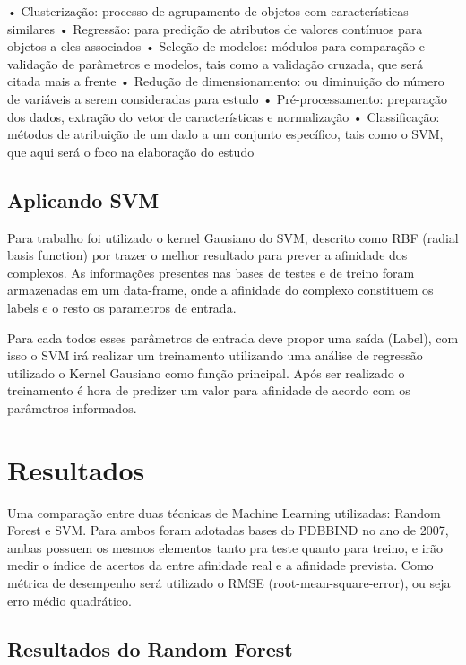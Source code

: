 \documentclass[tcc, capa]{texucpel}
\begin{document}
• Clusterização: processo de agrupamento de objetos com características similares
• Regressão: para predição de atributos de valores contínuos para objetos a eles associados
• Seleção de modelos: módulos para comparação e validação de parâmetros e modelos,
tais como a validação cruzada, que será citada mais a frente
• Redução de dimensionamento: ou diminuição do número de variáveis a serem
consideradas para estudo
• Pré-processamento: preparação dos dados, extração do vetor de características e
normalização
• Classificação: métodos de atribuição de um dado a um conjunto específico, tais como
o SVM, que aqui será o foco na elaboração do estudo

\section{Aplicando SVM}
Para trabalho foi utilizado o kernel Gausiano do SVM, descrito como RBF (radial basis function) %
por trazer o melhor resultado para prever a afinidade dos complexos.
As informações presentes nas bases de testes e de treino foram armazenadas em um data-frame, onde a afinidade do complexo constituem os labels e o resto os parametros de entrada. 

Para cada todos esses parâmetros de entrada deve propor uma saída (Label),  com isso o SVM irá realizar um treinamento utilizando uma análise de regressão utilizado o Kernel Gausiano como função principal.
Após ser realizado o treinamento é hora de predizer um valor para afinidade de acordo com os parâmetros informados.

\chapter{Resultados}
Uma comparação entre duas técnicas de Machine Learning utilizadas: Random Forest e SVM.
Para ambos foram adotadas bases do PDBBIND no ano de 2007, ambas possuem os mesmos elementos tanto pra teste quanto para treino, e irão medir o índice de acertos da entre afinidade real e a afinidade prevista.
Como métrica de desempenho será utilizado o RMSE (root-mean-square-error), ou seja erro médio quadrático.

\section{Resultados do Random Forest}
\end{document}
